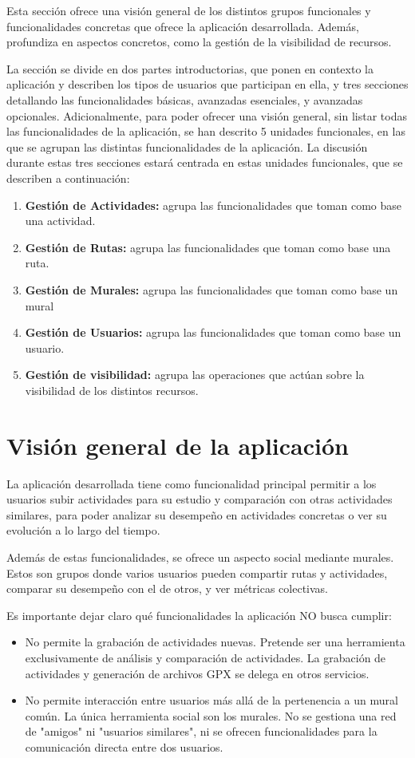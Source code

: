 Esta sección ofrece una visión general de los distintos grupos funcionales y funcionalidades concretas que ofrece la aplicación desarrollada. Además, profundiza en aspectos concretos, como la gestión de la visibilidad de recursos.

La sección se divide en dos partes introductorias, que ponen en contexto la aplicación y describen los tipos de usuarios que participan en ella, y tres secciones detallando las funcionalidades básicas, avanzadas esenciales, y avanzadas opcionales. Adicionalmente, para poder ofrecer una visión general, sin listar todas las funcionalidades de la aplicación, se han descrito 5 unidades funcionales, en las que se agrupan las distintas funcionalidades de la aplicación. La discusión durante estas tres secciones estará centrada en estas unidades funcionales, que se describen a continuación:
\begin{enumerate}
    \item \textbf{Gestión de Actividades:} agrupa las funcionalidades que toman como base una actividad. 
    \item \textbf{Gestión de Rutas:} agrupa las funcionalidades que toman como base una ruta. 
    \item \textbf{Gestión de Murales:} agrupa las funcionalidades que toman como base un mural 
    \item \textbf{Gestión de Usuarios:} agrupa las funcionalidades que toman como base un usuario. 
    \item \textbf{Gestión de visibilidad:} agrupa las operaciones que actúan sobre la visibilidad de los distintos recursos. 
\end{enumerate}


\section{Visión general de la aplicación}
La aplicación desarrollada tiene como funcionalidad principal permitir a los usuarios subir actividades para su estudio y comparación con otras actividades similares, para poder analizar su desempeño en actividades concretas o ver su evolución a lo largo del tiempo.

Además de estas funcionalidades, se ofrece un aspecto social mediante murales. Estos son grupos donde varios usuarios pueden compartir rutas y actividades, comparar su desempeño con el de otros, y ver métricas colectivas.

\noindent Es importante dejar claro qué funcionalidades la aplicación NO busca cumplir:
\begin{itemize}
    \item No permite la grabación de actividades nuevas. Pretende ser una herramienta exclusivamente de análisis y comparación de actividades. La grabación de actividades y generación de archivos GPX se delega en otros servicios.
    \item No permite interacción entre usuarios más allá de la pertenencia a un mural común. La única herramienta social son los murales. No se gestiona una red de "amigos" ni "usuarios similares", ni se ofrecen funcionalidades para la comunicación directa entre dos usuarios.
\end{itemize}

